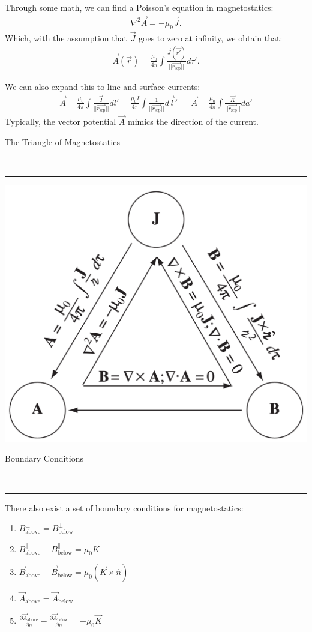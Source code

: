 \documentclass{article}
\newcommand{\sepvec}{\vec{r_\textrm{sep}}}
\newcommand{\header}[1]{\begin{large}\noindent #1\end{large}\\\rule{\textwidth}{0.5pt}}
\newcommand{\gap}{\medskip\\}
\begin{document}
Through some math, we can find a Poisson's equation in magnetostatics:
\begin{align*}
    \nabla^2 \vec{A} = -\mu_9 \vec{J}.
\end{align*}
Which, with the assumption that $\vec{J}$ goes to zero at infinity, we obtain that:
\begin{align*}
    \vec{A}(\vec{r}) = \frac{\mu_0}{4\pi} \int \frac{\vec{J}(\vec{r'})}{||\sepvec||}d\tau'.
\end{align*}

\pagebreak
We can also expand this to line and surface currents:
\begin{align*}
    \vec{A} = \frac{\mu_0}{4\pi} \int \frac{\vec{I}}{||\sepvec||}dl' = \frac{\mu_0 I}{4\pi} \int \frac{1}{||\sepvec||}d \vec{l}' && \vec{A} = \frac{\mu_0}{4\pi}\int \frac{\vec{K}}{||\sepvec||}da'
\end{align*}
Typically, the vector potential $\vec{A}$ mimics the direction of the current. 
\gap
\header{The Triangle of Magnetostatics}
\begin{center}
    \includegraphics[scale=0.35]{magnetic-triangle.png}
\end{center}
\header{Boundary Conditions}
There also exist a set of boundary conditions for magnetostatics:
\begin{enumerate}[label=(\alph*)]
    \item $B_\textrm{above}^\perp = B_\textrm{below}^\perp$
    \item $B_\textrm{above}^\parallel - B_\textrm{below}^\parallel = \mu_0 K$
    \item $\vec{B}_\textrm{above} - \vec{B}_\textrm{below} = \mu_0 (\vec{K} \times \hat{n})$
    \item $\vec{A}_\textrm{above} = \vec{A}_\textrm{below}$
    \item $\frac{\partial \vec{A}_\textrm{above}}{\partial n} - \frac{\partial \vec{A}_\textrm{below}}{\partial n} = - \mu_0 \vec{K}$
\end{enumerate}
\end{document}
